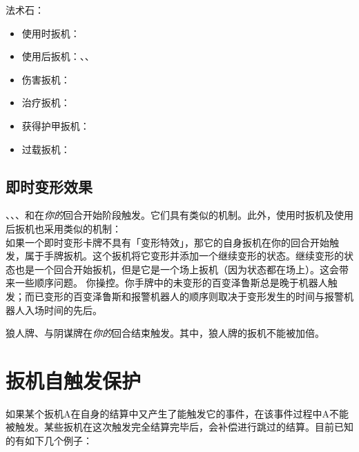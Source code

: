 法术石：
\begin{itemize}
    \item 使用时扳机：
    \item 使用后扳机：、、
    \item 伤害扳机：
    \item 治疗扳机：
    \item 获得护甲扳机：
    \item 过载扳机：
\end{itemize}

\subsection{即时变形效果}

、、、和在\emph{你的}回合开始阶段触发。它们具有类似的机制。此外，使用时扳机及使用后扳机也采用类似的机制：\\
如果一个即时变形卡牌不具有「变形特效」，那它的自身扳机在你的回合开始触发，属于手牌扳机。这个扳机将它变形并添加一个继续变形的状态。继续变形的状态也是一个回合开始扳机，但是它是一个场上扳机（因为状态都在场上）。这会带来一些顺序问题。
\example 你操控。你手牌中的未变形的百变泽鲁斯总是晚于机器人触发；而已变形的百变泽鲁斯和报警机器人的顺序则取决于变形发生的时间与报警机器人入场时间的先后。

狼人牌、与阴谋牌在\emph{你的}回合结束触发。其中，狼人牌的扳机不能被加倍。

\section{扳机自触发保护}
\label{self-triggering-protection}

如果某个扳机A在自身的结算中又产生了能触发它的事件，在该事件过程中A不能被触发。某些扳机在这次触发完全结算完毕后，会补偿进行跳过的结算。目前已知的有如下几个例子：

